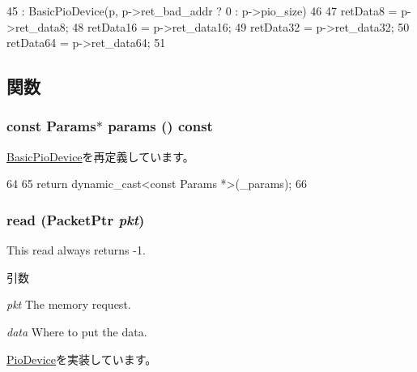 \begin{DoxyCode}
45     : BasicPioDevice(p, p->ret_bad_addr ? 0 : p->pio_size)
46 {
47     retData8 = p->ret_data8;
48     retData16 = p->ret_data16;
49     retData32 = p->ret_data32;
50     retData64 = p->ret_data64;
51 }
\end{DoxyCode}


\subsection{関数}
\hypertarget{classIsaFake_acd3c3feb78ae7a8f88fe0f110a718dff}{
\subsubsection[{params}]{\setlength{\rightskip}{0pt plus 5cm}const {\bf Params}$\ast$ params () const}}
\label{classIsaFake_acd3c3feb78ae7a8f88fe0f110a718dff}


\hyperlink{classBasicPioDevice_acd3c3feb78ae7a8f88fe0f110a718dff}{BasicPioDevice}を再定義しています。


\begin{DoxyCode}
64     {
65         return dynamic_cast<const Params *>(_params);
66     }
\end{DoxyCode}
\hypertarget{classIsaFake_a613ec7d5e1ec64f8d21fec78ae8e568e}{
\subsubsection[{read}]{ read ({\bf PacketPtr} {\em pkt})}}
\label{classIsaFake_a613ec7d5e1ec64f8d21fec78ae8e568e}
This read always returns -\/1. 
\begin{DoxyParams}{引数}
\item[{\em pkt}]The memory request. \item[{\em data}]Where to put the data. \end{DoxyParams}


\hyperlink{classPioDevice_a842312590432036092c422c87a442358}{PioDevice}を実装しています。


